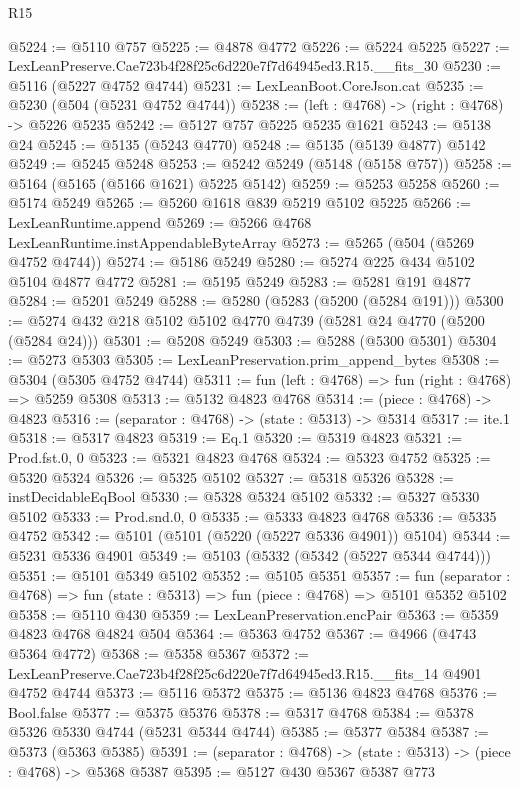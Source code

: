 \begin{lexlean}{R15}
\begin{coremodule}
{{{{{{{{{{{@5224 := @5110 @757
@5225 := @4878 @4772
@5226 := @5224 @5225
@5227 := LexLeanPreserve.Cae723b4f28f25c6d220e7f7d64945ed3.R15.__fits_30
@5230 := @5116 (@5227 @4752 @4744)
@5231 := LexLeanBoot.CoreJson.cat
@5235 := @5230 (@504 (@5231 @4752 @4744))
@5238 := (left : @4768) -> (right : @4768) -> @5226 @5235
@5242 := @5127 @757 @5225 @5235 @1621
@5243 := @5138 @24
@5245 := @5135 (@5243 @4770)
@5248 := @5135 (@5139 @4877) @5142
@5249 := @5245 @5248
@5253 := @5242 @5249 (@5148 (@5158 @757))
@5258 := @5164 (@5165 (@5166 @1621) @5225 @5142)
@5259 := @5253 @5258
@5260 := @5174 @5249
@5265 := @5260 @1618 @839 @5219 @5102 @5225
@5266 := LexLeanRuntime.append
@5269 := @5266 @4768 LexLeanRuntime.instAppendableByteArray
@5273 := @5265 (@504 (@5269 @4752 @4744))
@5274 := @5186 @5249
@5280 := @5274 @225 @434 @5102 @5104 @4877 @4772
@5281 := @5195 @5249
@5283 := @5281 @191 @4877
@5284 := @5201 @5249
@5288 := @5280 (@5283 (@5200 (@5284 @191)))
@5300 := @5274 @432 @218 @5102 @5102 @4770 @4739 (@5281 @24 @4770 (@5200 (@5284 @24)))
@5301 := @5208 @5249
@5303 := @5288 (@5300 @5301)
@5304 := @5273 @5303
@5305 := LexLeanPreservation.prim_append_bytes
@5308 := @5304 (@5305 @4752 @4744)
@5311 := fun (left : @4768) => fun (right : @4768) => @5259 @5308
@5313 := @5132 @4823 @4768
@5314 := (piece : @4768) -> @4823
@5316 := (separator : @4768) -> (state : @5313) -> @5314
@5317 := ite.{1}
@5318 := @5317 @4823
@5319 := Eq.{1}
@5320 := @5319 @4823
@5321 := Prod.fst.{0, 0}
@5323 := @5321 @4823 @4768
@5324 := @5323 @4752
@5325 := @5320 @5324
@5326 := @5325 @5102
@5327 := @5318 @5326
@5328 := instDecidableEqBool
@5330 := @5328 @5324 @5102
@5332 := @5327 @5330 @5102
@5333 := Prod.snd.{0, 0}
@5335 := @5333 @4823 @4768
@5336 := @5335 @4752
@5342 := @5101 (@5101 (@5220 (@5227 @5336 @4901)) @5104)
@5344 := @5231 @5336 @4901
@5349 := @5103 (@5332 (@5342 (@5227 @5344 @4744)))
@5351 := @5101 @5349 @5102
@5352 := @5105 @5351
@5357 := fun (separator : @4768) => fun (state : @5313) => fun (piece : @4768) => @5101 @5352 @5102
@5358 := @5110 @430
@5359 := LexLeanPreservation.encPair
@5363 := @5359 @4823 @4768 @4824 @504
@5364 := @5363 @4752
@5367 := @4966 (@4743 @5364 @4772)
@5368 := @5358 @5367
@5372 := LexLeanPreserve.Cae723b4f28f25c6d220e7f7d64945ed3.R15.__fits_14 @4901 @4752 @4744
@5373 := @5116 @5372
@5375 := @5136 @4823 @4768
@5376 := Bool.false
@5377 := @5375 @5376
@5378 := @5317 @4768
@5384 := @5378 @5326 @5330 @4744 (@5231 @5344 @4744)
@5385 := @5377 @5384
@5387 := @5373 (@5363 @5385)
@5391 := (separator : @4768) -> (state : @5313) -> (piece : @4768) -> @5368 @5387
@5395 := @5127 @430 @5367 @5387 @773
}}}}}}}}}}}
\end{coremodule}
\end{lexlean}

